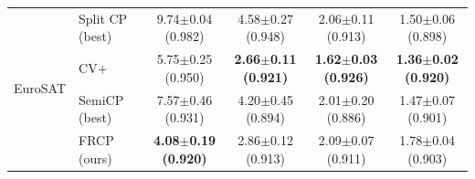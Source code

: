 \begin{table}[t]
\begin{tabular}{llcccc}
\midrule
\multirow{4}{*}{EuroSAT} & Split CP (best) & 9.74$\pm$0.04 {\scriptsize(0.982)} & 4.58$\pm$0.27 {\scriptsize(0.948)} & 2.06$\pm$0.11 {\scriptsize(0.913)} & 1.50$\pm$0.06 {\scriptsize(0.898)}\\
 & CV+ & 5.75$\pm$0.25 {\scriptsize(0.950)} & \textbf{2.66$\pm$0.11 {\scriptsize(0.921)}} & \textbf{1.62$\pm$0.03 {\scriptsize(0.926)}} & \textbf{1.36$\pm$0.02 {\scriptsize(0.920)}}\\
 & SemiCP (best) & 7.57$\pm$0.46 {\scriptsize(0.931)} & 4.20$\pm$0.45 {\scriptsize(0.894)} & 2.01$\pm$0.20 {\scriptsize(0.886)} & 1.47$\pm$0.07 {\scriptsize(0.901)}\\
 & FRCP (ours) & \textbf{4.08$\pm$0.19 {\scriptsize(0.920)}} & 2.86$\pm$0.12 {\scriptsize(0.913)} & 2.09$\pm$0.07 {\scriptsize(0.911)} & 1.78$\pm$0.04 {\scriptsize(0.903)}\\
\bottomrule
\end{tabular}
\end{table}
